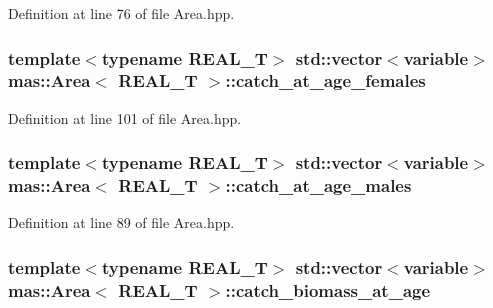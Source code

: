 Definition at line 76 of file Area.\-hpp.

\hypertarget{structmas_1_1_area_a6f5963d3731bc788e4ec0c0975ebb9b3}{
\subsubsection[{catch\-\_\-at\-\_\-age\-\_\-females}]{\setlength{\rightskip}{0pt plus 5cm}template$<$typename R\-E\-A\-L\-\_\-\-T$>$ std\-::vector$<${\bf variable}$>$ {\bf mas\-::\-Area}$<$ R\-E\-A\-L\-\_\-\-T $>$\-::catch\-\_\-at\-\_\-age\-\_\-females}}\label{structmas_1_1_area_a6f5963d3731bc788e4ec0c0975ebb9b3}


Definition at line 101 of file Area.\-hpp.

\hypertarget{structmas_1_1_area_a3e226c7a59b5840c37917d492ea0b958}{
\subsubsection[{catch\-\_\-at\-\_\-age\-\_\-males}]{\setlength{\rightskip}{0pt plus 5cm}template$<$typename R\-E\-A\-L\-\_\-\-T$>$ std\-::vector$<${\bf variable}$>$ {\bf mas\-::\-Area}$<$ R\-E\-A\-L\-\_\-\-T $>$\-::catch\-\_\-at\-\_\-age\-\_\-males}}\label{structmas_1_1_area_a3e226c7a59b5840c37917d492ea0b958}


Definition at line 89 of file Area.\-hpp.

\hypertarget{structmas_1_1_area_a7db1d1a4c66e3c535133c2aecbb4cc29}{
\subsubsection[{catch\-\_\-biomass\-\_\-at\-\_\-age}]{\setlength{\rightskip}{0pt plus 5cm}template$<$typename R\-E\-A\-L\-\_\-\-T$>$ std\-::vector$<${\bf variable}$>$ {\bf mas\-::\-Area}$<$ R\-E\-A\-L\-\_\-\-T $>$\-::catch\-\_\-biomass\-\_\-at\-\_\-age}}\label{structmas_1_1_area_a7db1d1a4c66e3c535133c2aecbb4cc29}


